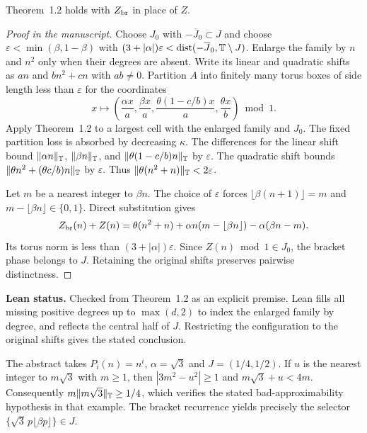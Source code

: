 \begin{corollary}\label{c:bracket-recurrence}
\leanok
Theorem~1.2 holds with $Z_{\rm br}$ in place of $Z$.
\end{corollary}
\begin{proof}[Proof in the manuscript]
\leanok
Choose $J_0$ with $-\overline J_0\subset J$ and choose
$\varepsilon<\min(\beta,1-\beta)$ with
$(3+|\alpha|)\varepsilon<\operatorname{dist}
(-\overline J_0,\mathbb T\setminus J)$.
Enlarge the family by $n$ and $n^2$ only when their degrees are
absent. Write its linear and quadratic shifts as $an$
and $bn^2+cn$ with $ab\ne0$. Partition $A$ into finitely many
torus boxes of side length less than $\varepsilon$ for the coordinates
\[
 x\longmapsto
 \left(\frac{\alpha x}a,\frac{\beta x}a,
       \frac{\theta(1-c/b)x}a,\frac{\theta x}b\right)\bmod1.
\]
Apply Theorem~1.2 to a largest cell with the enlarged family
and $J_0$. The fixed partition loss is absorbed by decreasing
$\kappa$. The differences for the linear shift bound
$\lVert\alpha n\rVert_{\mathbb T}$, $\lVert\beta n\rVert_{\mathbb T}$, and
$\lVert\theta(1-c/b)n\rVert_{\mathbb T}$ by $\varepsilon$. The quadratic shift
bounds $\lVert\theta n^2+(\theta c/b)n\rVert_{\mathbb T}$ by $\varepsilon$.
Thus $\lVert\theta(n^2+n)\rVert_{\mathbb T}<2\varepsilon$.

Let $m$ be a nearest integer to $\beta n$. The choice of
$\varepsilon$ forces $\lfloor\beta(n+1)\rfloor=m$ and
$m-\lfloor\beta n\rfloor\in\{0,1\}$. Direct substitution gives
\[
 Z_{\rm br}(n)+Z(n)=\theta(n^2+n)
     +\alpha n(m-\lfloor\beta n\rfloor)-\alpha(\beta n-m).
\]
Its torus norm is less than $(3+|\alpha|)\varepsilon$.
Since $Z(n)\bmod1\in J_0$, the bracket phase belongs to $J$.
Retaining the original shifts preserves pairwise distinctness.
\end{proof}
\noindent\textbf{Lean status.} Checked from Theorem~1.2 as an
explicit premise.
Lean fills all missing positive degrees up to $\max(d,2)$ to
index the enlarged family by degree, and reflects the central
half of $J$. Restricting the configuration to the original
shifts gives the stated conclusion.

The abstract takes $P_i(n)=n^i$, $\alpha=\sqrt3$ and
$J=(1/4,1/2)$. If $u$ is the nearest integer to $m\sqrt3$
with $m\ge1$, then $|3m^2-u^2|\ge1$ and
$m\sqrt3+u<4m$. Consequently $m\lVert m\sqrt3\rVert_{\mathbb T}\ge1/4$,
which verifies the stated bad-approximability hypothesis in that
example. The bracket recurrence yields precisely the selector
$\{\sqrt3\,p\lfloor\beta p\rfloor\}\in J$.


